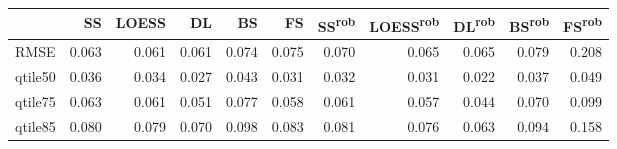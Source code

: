 \begin{tabular}{lrrrrrrrrrr}
\toprule
 & SS & LOESS & DL & BS & FS & SS\textsuperscript{rob} & LOESS\textsuperscript{rob} & DL\textsuperscript{rob} & BS\textsuperscript{rob} & FS\textsuperscript{rob} \\
\midrule
RMSE & {\cellcolor[HTML]{EEEEEE}} \color[HTML]{000000} 0.063 & {\cellcolor[HTML]{F1F1F1}} \color[HTML]{000000} 0.061 & {\cellcolor[HTML]{F1F1F1}} \color[HTML]{000000} 0.061 & {\cellcolor[HTML]{DCDCDC}} \color[HTML]{000000} 0.074 & {\cellcolor[HTML]{DADADA}} \color[HTML]{000000} 0.075 & {\cellcolor[HTML]{E2E2E2}} \color[HTML]{000000} 0.070 & {\cellcolor[HTML]{EBEBEB}} \color[HTML]{000000} 0.065 & {\cellcolor[HTML]{EBEBEB}} \color[HTML]{000000} 0.065 & {\cellcolor[HTML]{D3D3D3}} \color[HTML]{000000} 0.079 & {\cellcolor[HTML]{000000}} \color[HTML]{F1F1F1} 0.208 \\
qtile50 & {\cellcolor[HTML]{747474}} \color[HTML]{F1F1F1} 0.036 & {\cellcolor[HTML]{868686}} \color[HTML]{F1F1F1} 0.034 & {\cellcolor[HTML]{C4C4C4}} \color[HTML]{000000} 0.027 & {\cellcolor[HTML]{353535}} \color[HTML]{F1F1F1} 0.043 & {\cellcolor[HTML]{A0A0A0}} \color[HTML]{F1F1F1} 0.031 & {\cellcolor[HTML]{989898}} \color[HTML]{F1F1F1} 0.032 & {\cellcolor[HTML]{A0A0A0}} \color[HTML]{F1F1F1} 0.031 & {\cellcolor[HTML]{F1F1F1}} \color[HTML]{000000} 0.022 & {\cellcolor[HTML]{6B6B6B}} \color[HTML]{F1F1F1} 0.037 & {\cellcolor[HTML]{000000}} \color[HTML]{F1F1F1} 0.049 \\
qtile75 & {\cellcolor[HTML]{9E9E9E}} \color[HTML]{F1F1F1} 0.063 & {\cellcolor[HTML]{A6A6A6}} \color[HTML]{F1F1F1} 0.061 & {\cellcolor[HTML]{D2D2D2}} \color[HTML]{000000} 0.051 & {\cellcolor[HTML]{606060}} \color[HTML]{F1F1F1} 0.077 & {\cellcolor[HTML]{B3B3B3}} \color[HTML]{000000} 0.058 & {\cellcolor[HTML]{A6A6A6}} \color[HTML]{F1F1F1} 0.061 & {\cellcolor[HTML]{B8B8B8}} \color[HTML]{000000} 0.057 & {\cellcolor[HTML]{F1F1F1}} \color[HTML]{000000} 0.044 & {\cellcolor[HTML]{7E7E7E}} \color[HTML]{F1F1F1} 0.070 & {\cellcolor[HTML]{000000}} \color[HTML]{F1F1F1} 0.099 \\
qtile85 & {\cellcolor[HTML]{C6C6C6}} \color[HTML]{000000} 0.080 & {\cellcolor[HTML]{C8C8C8}} \color[HTML]{000000} 0.079 & {\cellcolor[HTML]{E0E0E0}} \color[HTML]{000000} 0.070 & {\cellcolor[HTML]{989898}} \color[HTML]{F1F1F1} 0.098 & {\cellcolor[HTML]{BFBFBF}} \color[HTML]{000000} 0.083 & {\cellcolor[HTML]{C3C3C3}} \color[HTML]{000000} 0.081 & {\cellcolor[HTML]{D0D0D0}} \color[HTML]{000000} 0.076 & {\cellcolor[HTML]{F1F1F1}} \color[HTML]{000000} 0.063 & {\cellcolor[HTML]{A2A2A2}} \color[HTML]{F1F1F1} 0.094 & {\cellcolor[HTML]{000000}} \color[HTML]{F1F1F1} 0.158 \\

\end{tabular}
